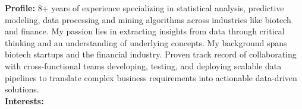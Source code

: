 
\vspace*{-3mm}

\begin{tcolorbox}[
        width=\textwidth,
        colback={gray!20},
        colframe=white,
        sharp corners,
        boxrule=0mm,
        arc=1mm,
    ]
    \vspace*{-1mm}
    \begin{spacing}{1.2}
        \setlength{\columnsep}{5mm}
        \begin{multicols}{2}

            {
                \bf
                \large
                Profile:
            }
            8+ years of experience specializing in statistical analysis, predictive modeling, data processing and mining algorithms across industries like biotech and finance. My passion lies in extracting insights from data through critical thinking and an understanding of underlying concepts. My background spans biotech startups and the financial industry. Proven track record of collaborating with cross-functional teams developing, testing, and deploying scalable data pipelines to translate complex business requirements into actionable data-driven solutions.\\[-4mm]

            {
            \bf
            \large
            Interests:
            }


\end{multicols}
\end{spacing}
\end{tcolorbox}
